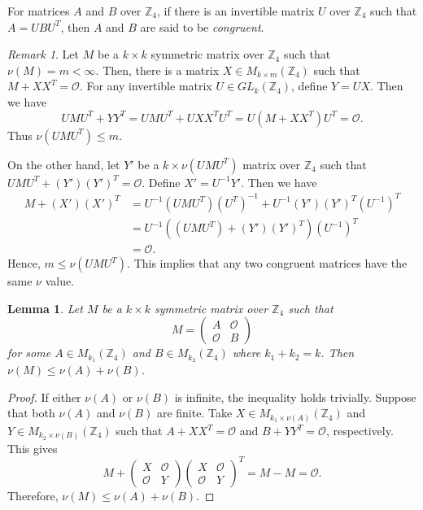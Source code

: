 \documentclass{article}
\newtheorem{lemma}[theorem]{Lemma}
\theoremstyle{definition}
\theoremstyle{remark}
\newtheorem{remark}{Remark}
\begin{document}
For matrices $A$ and $B$ over $\mathbb{Z}_4$, if there is an invertible matrix $U$ over $\mathbb{Z}_4$ such that $A=UBU^T$, then $A$ and $B$ are said to be \textit{congruent}.

\begin{remark}\label{embed-cong}
    Let $M$ be a $k\times k$ symmetric matrix over $\mathbb{Z}_4$ such that $\nu(M)=m<\infty$. Then, there is a matrix $X\in M_{k\times m}(\mathbb{Z}_4)$ such that $M+XX^T=\mathcal{O}$. For any invertible matrix $U\in GL_k(\mathbb{Z}_4)$, define $Y=UX$. Then we have
    \[
    UMU^T+YY^T=UMU^T+UXX^TU^T=U(M+XX^T)U^T=\mathcal{O}.
    \]
    Thus $\nu(UMU^T)\le m$.

    On the other hand, let $Y'$ be a $k\times \nu(UMU^T)$ matrix over $\mathbb{Z}_4$ such that $UMU^T+(Y')(Y')^T=\mathcal{O}$. Define $X'=U^{-1}Y'$. Then we have
    \begin{align*}
    M+(X')(X')^T&=U^{-1}(UMU^T)(U^T)^{-1}+U^{-1}(Y')(Y')^T(U^{-1})^T\\&=U^{-1}((UMU^T)+(Y')(Y')^T)(U^{-1})^T\\&=\mathcal{O}.
    \end{align*}
    Hence, $m\le \nu(UMU^T)$. This implies that any two congruent matrices have the same $\nu$ value.
\end{remark}

\begin{lemma}\label{embed-inequal}
    Let $M$ be a $k\times k$ symmetric matrix over $\mathbb{Z}_4$ such that 
    \[
    M=\begin{pmatrix} A & \mathcal{O}\\\mathcal{O} & B \end{pmatrix}
    \]
    for some $A\in M_{k_1}(\mathbb{Z}_4)$ and $B\in M_{k_2}(\mathbb{Z}_4)$ where $k_1+k_2=k$. Then $\nu(M)\le \nu(A)+\nu(B)$.
\end{lemma}
\begin{proof}
If either $\nu(A)$ or $\nu(B)$ is infinite, the inequality holds trivially. Suppose that both $\nu(A)$ and $\nu(B)$ are finite. Take $X\in M_{k_1\times \nu(A)}(\mathbb{Z}_4)$ and $Y\in M_{k_2\times \nu(B)}(\mathbb{Z}_4)$ such that $A+XX^T=\mathcal{O}$ and $B+YY^T=\mathcal{O}$, respectively. This gives \[
    M+\begin{pmatrix} X & \mathcal{O}\\\mathcal{O} & Y \end{pmatrix}\begin{pmatrix} X & \mathcal{O}\\\mathcal{O} & Y \end{pmatrix}^T=M-M=\mathcal{O}.
    \]
    Therefore, $\nu(M)\le \nu(A)+\nu(B)$.
\end{proof}
\end{document}

